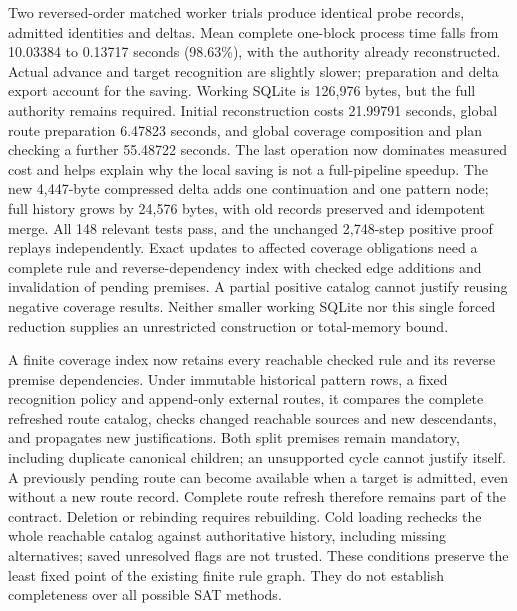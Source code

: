 \documentclass[11pt,a4paper]{article}
\numberwithin{equation}{section}
\theoremstyle{plain}
\theoremstyle{definition}
\theoremstyle{remark}
\begin{document}
Two reversed-order matched worker trials produce identical probe records, admitted identities and deltas. Mean complete one-block process time falls from 10.03384 to 0.13717 seconds (98.63\%), with the authority already reconstructed. Actual advance and target recognition are slightly slower; preparation and delta export account for the saving. Working SQLite is 126,976 bytes, but the full authority remains required. Initial reconstruction costs 21.99791 seconds, global route preparation 6.47823 seconds, and global coverage composition and plan checking a further 55.48722 seconds. The last operation now dominates measured cost and helps explain why the local saving is not a full-pipeline speedup. The new 4,447-byte compressed delta adds one continuation and one pattern node; full history grows by 24,576 bytes, with old records preserved and idempotent merge. All 148 relevant tests pass, and the unchanged 2,748-step positive proof replays independently. Exact updates to affected coverage obligations need a complete rule and reverse-dependency index with checked edge additions and invalidation of pending premises. A partial positive catalog cannot justify reusing negative coverage results. Neither smaller working SQLite nor this single forced reduction supplies an unrestricted construction or total-memory bound.



A finite coverage index now retains every reachable checked rule and its reverse premise dependencies. Under immutable historical pattern rows, a fixed recognition policy and append-only external routes, it compares the complete refreshed route catalog, checks changed reachable sources and new descendants, and propagates new justifications. Both split premises remain mandatory, including duplicate canonical children; an unsupported cycle cannot justify itself. A previously pending route can become available when a target is admitted, even without a new route record. Complete route refresh therefore remains part of the contract. Deletion or rebinding requires rebuilding. Cold loading rechecks the whole reachable catalog against authoritative history, including missing alternatives; saved unresolved flags are not trusted. These conditions preserve the least fixed point of the existing finite rule graph. They do not establish completeness over all possible SAT methods.
\end{document}
